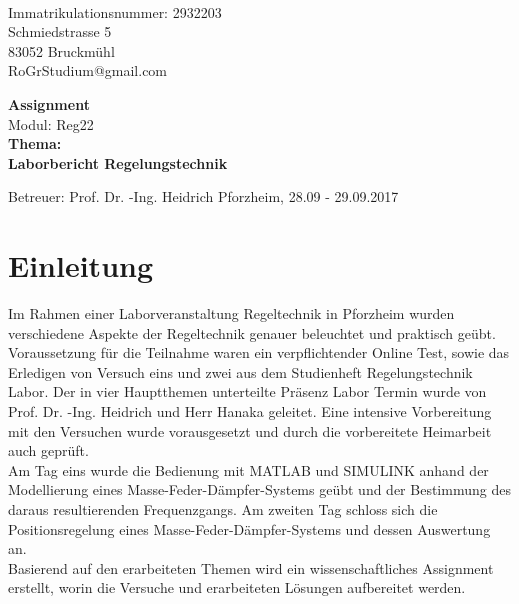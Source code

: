 \documentclass[12pt,a4paper]{scrartcl}	%
\begin{document}
\begin{titlepage}
	\\
	Immatrikulationsnummer:	2932203\\
	Schmiedstrasse 5\\
	83052 Bruckmühl\\
	RoGrStudium@gmail.com\\
	\vspace{5cm}
	
	\begin{center}
		{\Huge \textbf{Assignment} }\\ 
		Modul: Reg22\\
		\vspace{1cm}
		\textbf{Thema:}\\
		\textbf{\large{Laborbericht Regelungstechnik}}\\
	
	\end{center}
	
	\vspace{6cm}
	Betreuer: Prof. Dr. -Ing. Heidrich
	\vfill Pforzheim, 28.09 - 29.09.2017

\end{titlepage}
\newpage

\clearpage
\thispagestyle{empty}

\tableofcontents
\newpage
\clearpage
\thispagestyle{empty}
\listoffigures
\newpage

\setcounter{page}{1}
\section{Einleitung}
Im Rahmen einer Laborveranstaltung Regeltechnik in Pforzheim wurden verschiedene Aspekte der Regeltechnik genauer beleuchtet und praktisch geübt.\\
Voraussetzung für die Teilnahme waren ein verpflichtender Online Test, sowie das Erledigen von Versuch eins und zwei aus dem Studienheft \glqq Regelungstechnik Labor\grqq.
Der in vier Hauptthemen unterteilte Präsenz Labor Termin wurde von Prof. Dr. -Ing. Heidrich und Herr Hanaka geleitet.
Eine intensive Vorbereitung mit den Versuchen wurde vorausgesetzt und durch die vorbereitete Heimarbeit auch geprüft.\\
Am Tag eins wurde die Bedienung mit MATLAB und SIMULINK anhand der Modellierung eines Masse-Feder-Dämpfer-Systems geübt und der Bestimmung des daraus resultierenden Frequenzgangs.
Am zweiten Tag schloss sich die Positionsregelung eines Masse-Feder-Dämpfer-Systems und dessen Auswertung an.\\
Basierend auf den erarbeiteten Themen wird ein wissenschaftliches Assignment erstellt, worin die Versuche und erarbeiteten Lösungen aufbereitet werden.
\end{document}
